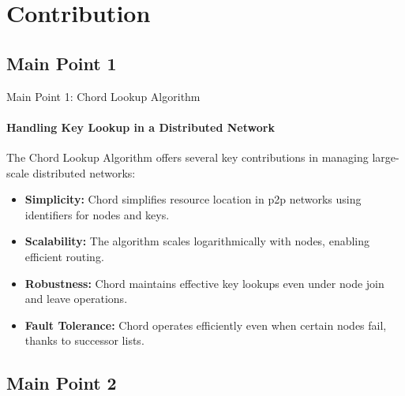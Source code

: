 \documentclass[11pt]{beamer}              %
\begin{document}
\section{Contribution}
\subsection{Main Point 1}
\begin{frame}{Main Point 1: Chord Lookup Algorithm}
\framesubtitle{Handling Key Lookup in a Distributed Network}

The Chord Lookup Algorithm offers several key contributions in managing large-scale distributed networks:

\begin{itemize}
    \item \textbf{Simplicity:} Chord simplifies resource location in p2p networks using identifiers for nodes and keys.
    \item \textbf{Scalability:} The algorithm scales logarithmically with nodes, enabling efficient routing.
    \item \textbf{Robustness:} Chord maintains effective key lookups even under node join and leave operations.
    \item \textbf{Fault Tolerance:} Chord operates efficiently even when certain nodes fail, thanks to successor lists.
\end{itemize}
\end{frame}


\subsection{Main Point 2}
\end{document}
